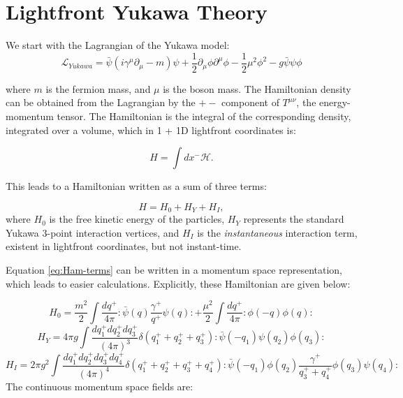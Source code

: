 \section{Lightfront Yukawa Theory}
\label{sec:yukawa-theory}
We start with the Lagrangian of the Yukawa model:
\begin{equation}
    \label{eq:yukawa-lagrangian}
    \mathcal{L}_{Yukawa} = \bar \psi \left(i\gamma^\mu \partial_\mu - m \right)\psi + \frac{1}{2}\partial_\mu \phi \partial^\mu \phi - \frac{1}{2}\mu^2\phi^2 - g\bar \psi \psi \phi
\end{equation}

where $m$ is the fermion mass, and $\mu$ is the boson mass.
The Hamiltonian density can be obtained from the Lagrangian by the $+-$ component of $T^{\mu \nu}$, the energy-momentum tensor.
The Hamiltonian is the integral of the corresponding density, integrated over a volume, which in 1 + 1D lightfront coordinates is:

\begin{equation}
    H = \int dx^- \mathcal{H}.
\end{equation}

This leads to a Hamiltonian written as a sum of three terms: 

\begin{equation}
    \label{eq:Ham-terms}
    H = H_0 + H_Y + H_I,
\end{equation}
where $H_0$ is the free kinetic energy of the particles, $H_Y$ represents the standard Yukawa 3-point interaction vertices, and $H_I$ is the \textit{instantaneous} interaction term, existent in lightfront coordinates, but not instant-time.

Equation \ref{eq:Ham-terms} can be written in a momentum space representation, which leads to easier calculations.
Explicitly, these Hamiltonian are given below:


\begin{equation}
    \label{eq:H-free}
    H_0 = \frac{m^2}{2}\int \frac{dq^+}{4\pi} :\bar \psi(q) \frac{\gamma^+}{q^+}\psi(q): + \frac{\mu^2}{2}\int \frac{dq^+}{4\pi} :\phi(-q)\phi(q): 
\end{equation}
\begin{equation}
    \label{eq:H-3}
    H_Y = 4\pi g\int \frac{dq_1^+ dq_2^+ dq_3^+}{(4\pi)^3}\delta(q_1^+ + q_2^+ +q_3^+):\bar \psi(-q_1) \psi(q_2) \phi(q_3):
\end{equation}
\begin{equation}
    \label{eq:H-4}
    H_I = 2\pi g^2\int \frac{dq_1^+ dq_2^+ dq_3^+ dq_4^+}{(4\pi)^4}\delta(q_1^+ + q_2^+ +q_3^+ + q_4^+):\bar \psi(-q_1) \phi(q_2)\frac{\gamma^+}{q_3^+ + q_4^+} \phi(q_3) \psi(q_4):
\end{equation}
The continuous momentum space fields are:

